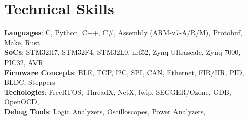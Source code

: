 \documentclass[letterpaper,10pt]{article}
\begin{document}
\section{Technical Skills}
 \begin{itemize}[leftmargin=0.15in, label={}]
    \small{\item{
     \textbf{Languages}{: C, Python, C++, C\#, Assembly (ARM-v7-A/R/M), Protobuf, Make, Rust} \\
     \textbf{SoCs}{: STM32H7, STM32F4, STM32L0, nrf52, Zynq Ultrascale, Zynq 7000, PIC32, AVR} \\
     \textbf{Firmware Concepts}{: BLE, TCP, I2C, SPI, CAN, Ethernet, FIR/IIR, PID, BLDC, Steppers } \\
     \textbf{Techologies}{: FreeRTOS, ThreadX, NetX, lwip, SEGGER/Ozone, GDB, OpenOCD,  } \\
     \textbf{Debug Tools}{: Logic Analyzers, Oscilloscopes, Power Analyzers, }
    }}
 \end{itemize}

\end{document}
